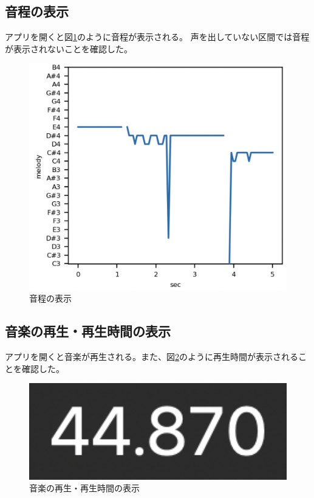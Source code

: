 \documentclass[a4paper,11pt]{jsarticle}
\begin{document}
\newpage
\subsection{音程の表示}
アプリを開くと図\ref{fig:note}のように音程が表示される。
声を出していない区間では音程が表示されないことを確認した。

\begin{figure}[h]
\centering
\includegraphics[keepaspectratio, width=13cm]
{./images/work3_melody.png}
\caption{音程の表示}
\label{fig:note}
\end{figure}

\newpage
\subsection{音楽の再生・再生時間の表示}
アプリを開くと音楽が再生される。また、図\ref{fig:music}のように再生時間が表示されることを確認した。

\begin{figure}[h]
\centering
\includegraphics[keepaspectratio, width=13cm]
{./images/work3_play_time.png}
\caption{音楽の再生・再生時間の表示}
\label{fig:music}
\end{figure}
\end{document}

